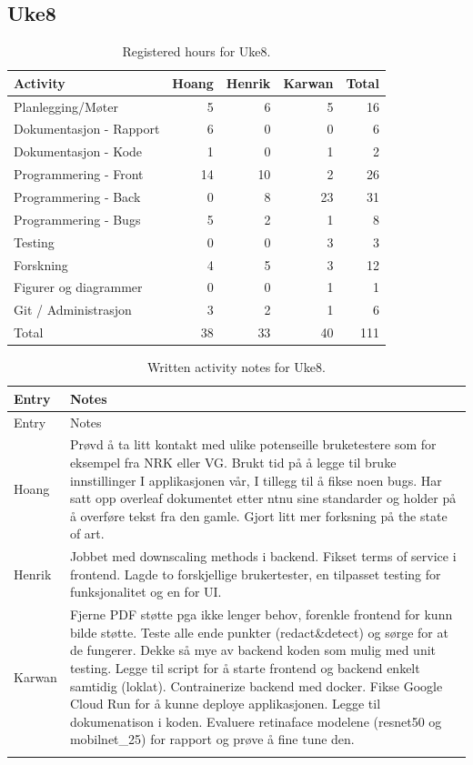 \subsection{Uke8}

\begin{table}[H]
\centering
\small
\caption{Registered hours for Uke8.}
\label{tab:project-hours-uke8}
\begin{tabular}{lrrrr}
\toprule
Activity & Hoang & Henrik & Karwan & Total \\
\midrule
Planlegging/Møter & 5 & 6 & 5 & 16 \\
Dokumentasjon - Rapport & 6 & 0 & 0 & 6 \\
Dokumentasjon - Kode & 1 & 0 & 1 & 2 \\
Programmering - Front & 14 & 10 & 2 & 26 \\
Programmering - Back & 0 & 8 & 23 & 31 \\
Programmering - Bugs & 5 & 2 & 1 & 8 \\
Testing & 0 & 0 & 3 & 3 \\
Forskning & 4 & 5 & 3 & 12 \\
Figurer og diagrammer & 0 & 0 & 1 & 1 \\
Git / Administrasjon & 3 & 2 & 1 & 6 \\
\midrule
Total & 38 & 33 & 40 & 111 \\
\bottomrule
\end{tabular}
\end{table}

\begin{longtable}{p{}p{}}
\caption{Written activity notes for Uke8.}\\
\toprule
Entry & Notes \\
\midrule
\endfirsthead
\toprule
Entry & Notes \\
\midrule
\endhead
Hoang & Prøvd å ta litt kontakt med ulike potenseille bruketestere som for eksempel fra NRK eller VG. Brukt tid på å legge til bruke innstillinger I applikasjonen vår, I tillegg til å fikse noen bugs. Har satt opp overleaf dokumentet etter ntnu sine standarder og holder på å overføre tekst fra den gamle. Gjort litt mer forksning på the state of art. \\
\addlinespace
Henrik & Jobbet med downscaling methods i backend. Fikset terms of service i frontend. Lagde to forskjellige brukertester, en tilpasset testing for funksjonalitet og en for UI. \\
\addlinespace
Karwan & Fjerne PDF støtte pga ikke lenger behov, forenkle frontend for kunn bilde støtte. Teste alle ende punkter (redact\&detect) og sørge for at de fungerer. Dekke så mye av backend koden som mulig med unit testing. Legge til script for å starte frontend og backend enkelt samtidig (loklat). Contrainerize backend med docker. Fikse Google Cloud Run for å kunne deploye applikasjonen. Legge til dokumenatison i koden. Evaluere retinaface modelene (resnet50 og mobilnet\_25) for rapport og prøve å fine tune den. \\
\addlinespace
\bottomrule
\end{longtable}

